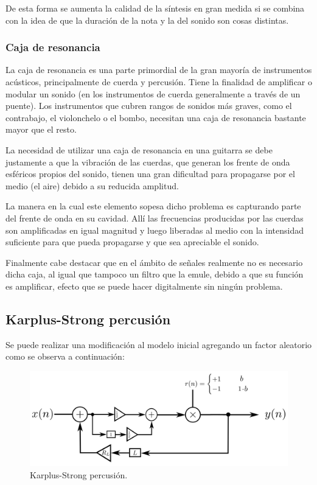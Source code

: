 De esta forma se aumenta la calidad de la síntesis en gran medida si se combina con la idea de que la duración de la nota y la del sonido son cosas distintas.

\subsubsection{Caja de resonancia}
La caja de resonancia es una parte primordial de la gran mayoría de instrumentos acústicos, principalmente de cuerda y percusión. Tiene la finalidad de amplificar o modular un sonido (en los instrumentos de cuerda generalmente a través de un puente). Los instrumentos que cubren rangos de sonidos más graves, como el contrabajo, el violonchelo o el bombo, necesitan una caja de resonancia bastante mayor que el resto.

La necesidad de utilizar una caja de resonancia en una guitarra se debe justamente a que la vibración de las cuerdas, que generan los frente de onda esféricos propios del sonido, tienen una gran dificultad para propagarse por el medio (el aire) debido a su reducida amplitud.

La manera en la cual este elemento sopesa dicho problema es capturando parte del frente de onda en su cavidad. Allí las frecuencias producidas por las cuerdas son amplificadas en igual magnitud y luego liberadas al medio con la intensidad suficiente para que pueda propagarse y que sea apreciable el sonido.

Finalmente cabe destacar que en el ámbito de señales realmente no es necesario dicha caja, al igual que tampoco un filtro que la emule, debido a que su función es amplificar, efecto que se puede hacer digitalmente sin ningún problema. 

\subsection{Karplus-Strong percusión}
Se puede realizar una modificación al modelo inicial agregando un factor aleatorio como se observa a continuación:
\begin{figure}[H]
	\centering
	\includegraphics[width=1\textwidth]{ImagenesEjercicio4/ksdrum.PNG}
	\caption{Karplus-Strong percusión.}
	\label{fig:KSPERC}
\end{figure}

